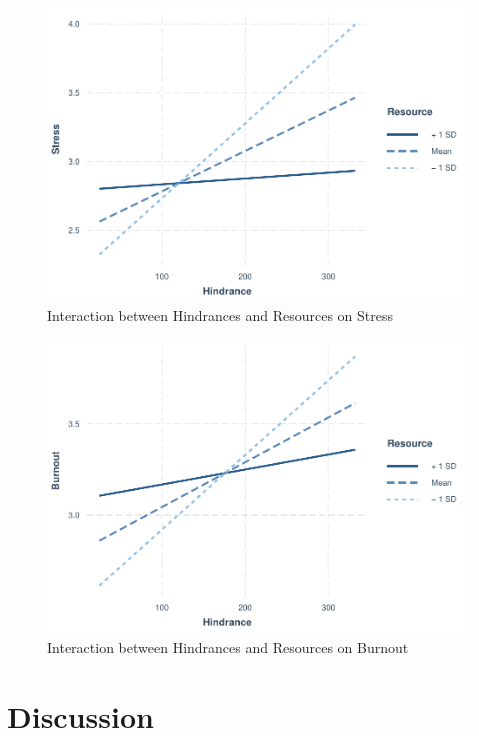 \documentclass[
  man]{apa7}
\begin{document}
\begin{figure}
\centering
\includegraphics{Submission_files/figure-latex/hind-resource-stress-int-1.pdf}
\caption{\label{fig:hind-resource-stress-int}Interaction between Hindrances and Resources on Stress}
\end{figure}

\begin{figure}
\centering
\includegraphics{Submission_files/figure-latex/hind-resource-burn-int-1.pdf}
\caption{\label{fig:hind-resource-burn-int}Interaction between Hindrances and Resources on Burnout}
\end{figure}

\section{Discussion}\label{discussion}
\end{document}
